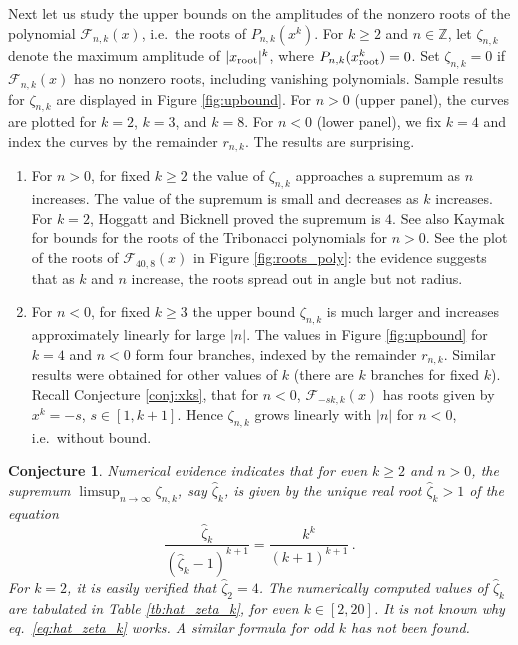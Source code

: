 \documentclass[review]{elsarticle}
\theoremstyle{plain}
\newtheorem{conjecture}[theorem]{Conjecture}
\begin{document}
Next let us study the upper bounds on the amplitudes of the nonzero roots of the polynomial $\mathcal{F}_{n,k}(x)$,
i.e.~the roots of $P_{n,k}(x^k)$.
For $k\ge2$ and $n\in\mathbb{Z}$,
let $\zeta_{n,k}$ denote the maximum amplitude of $|x_{\rm root}|^k$,
where $P_{n,k}(x_{\rm root}^k)=0$.
Set $\zeta_{n,k}=0$ if $\mathcal{F}_{n,k}(x)$ has no nonzero roots, including vanishing polynomials.
Sample results for $\zeta_{n,k}$ are displayed in Figure \ref{fig:upbound}.
For $n>0$ (upper panel), the curves are plotted for $k=2$, $k=3$, and $k=8$.
For $n<0$ (lower panel), we fix $k=4$ and index the curves by the remainder $r_{n,k}$.
The results are surprising.
\begin{enumerate}
\item
  For $n>0$, for fixed $k\ge2$ the value of $\zeta_{n,k}$ approaches a supremum as $n$ increases.
  The value of the supremum is small and decreases as $k$ increases.
  For $k=2$, Hoggatt and Bicknell \cite{HoggattBicknell_roots} proved the supremum is $4$.
  See also Kaymak \cite{Kaymak} for bounds for the roots of the Tribonacci polynomials for $n>0$.
  See the plot of the roots of $\mathcal{F}_{40,8}(x)$ in Figure \ref{fig:roots_poly}:
  the evidence suggests that as $k$ and $n$ increase, the roots spread out in angle but not radius.
  
\item
  For $n<0$, for fixed $k\ge3$ the upper bound $\zeta_{n,k}$ is much larger and increases approximately linearly for large $|n|$.
  The values in Figure \ref{fig:upbound} for $k=4$ and $n<0$ form four branches, indexed by the remainder $r_{n,k}$.
  Similar results were obtained for other values of $k$ (there are $k$ branches for fixed $k$).
  Recall Conjecture \ref{conj:xks}, that for $n<0$, $\mathcal{F}_{-sk,k}(x)$ has roots given by $x^k = -s$, $s\in[1,k+1]$.
  Hence $\zeta_{n,k}$ grows linearly with $|n|$ for $n<0$, i.e.~without bound.
\end{enumerate}
\begin{conjecture}
Numerical evidence indicates that for even $k\ge2$ and $n>0$, 
the supremum $\limsup_{n\to\infty}\zeta_{n,k}$, say $\hat{\zeta}_k$, is given by the unique real root $\hat{\zeta}_k>1$ of the equation
\begin{equation}
\label{eq:hat_zeta_k}  
\frac{\hat{\zeta}_k}{(\hat{\zeta}_k-1)^{k+1}} = \frac{k^k}{(k+1)^{k+1}} \,.
\end{equation}
For $k=2$, it is easily verified that $\hat{\zeta}_2=4$.
The numerically computed values of $\hat{\zeta}_k$ are tabulated in Table \ref{tb:hat_zeta_k}, for even $k\in[2,20]$.
It is not known why eq.~\eqref{eq:hat_zeta_k} works.
A similar formula for odd $k$ has not been found.
\end{conjecture}
\end{document}

